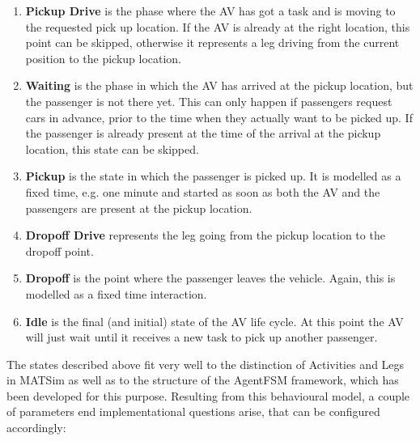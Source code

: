 \begin{enumerate}
\item \textbf{Pickup Drive} is the phase where the AV has got a task and is moving
to the requested pick up location. If the AV is already at the right location, this
point can be skipped, otherwise it represents a leg driving from the current position
to the pickup location.
\item \textbf{Waiting} is the phase in which the AV has arrived at the pickup
location, but the passenger is not there yet. This can only happen if passengers
request cars in advance, prior to the time when they actually want to be picked
up. If the passenger is already present at the time of the arrival at the pickup
location, this state can be skipped.
\item \textbf{Pickup} is the state in which the passenger is picked up. It is
modelled as a fixed time, e.g. one minute and started as soon as both the AV
and the passengers are present at the pickup location.
\item \textbf{Dropoff Drive} represents the leg going from the pickup location to
the dropoff point.
\item \textbf{Dropoff} is the point where the passenger leaves the vehicle. Again,
this is modelled as a fixed time interaction.
\item \textbf{Idle} is the final (and initial) state of the AV life cycle. At this
point the AV will just wait until it receives a new task to pick up another passenger.
\end{enumerate}

The states described above fit very well to the distinction of Activities and Legs
in MATSim as well as to the structure of the AgentFSM framework, which has been
developed for this purpose. Resulting from this behavioural model, a couple of
parameters end implementational questions arise, that can be configured accordingly:

